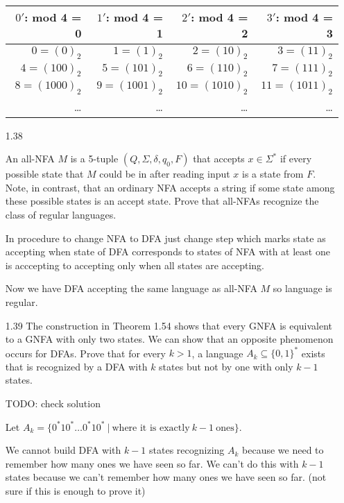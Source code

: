 \begin{enumerate}
          \begin{table}[H]
              \centering
              \begin{tabular}{|r|r|r|r|}
                  \hline
                  $0'$: mod 4 = 0 & $1'$: mod  4 = 1 & $2'$: mod 4 = 2 & $3'$: mod 4 = 3 \\
                  \hline
                  $0 = (0)_2$     & $1 = (1)_2$      & $2 = (10)_2$    & $3 = (11)_2$    \\
                  $4 = (100)_2$   & $5 = (101)_2$    & $6 = (110)_2$   & $7 = (111)_2$   \\
                  $8 = (1000)_2$  & $9 = (1001)_2$   & $10 = (1010)_2$ & $11 = (1011)_2$ \\
                  \ldots          & \ldots           & \ldots          & \ldots          \\
                  \hline
              \end{tabular}
          \end{table}

    \item [1.38]

          An all-NFA $M$ is a 5-tuple $(Q,\Sigma,\delta,q_0,F)$ that accepts $x \in \Sigma^\ast$ if every possible state that $M$ could be in after reading input $x$ is a state from $F$. Note, in contrast, that an ordinary NFA accepts a string if some state among these possible states is an accept state. Prove that all-NFAs recognize the class of regular languages.

          In procedure to change NFA to DFA just change step which marks state as accepting when state of DFA corresponds to states of NFA with at least one is acccepting to accepting only when all states are accepting.

          Now we have DFA accepting the same language as all-NFA $M$ so language is regular.
    \item [1.39]
          The construction in Theorem 1.54 shows that every GNFA is equivalent to a GNFA with only two states. We can show that an opposite phenomenon occurs for DFAs. Prove that for every $k > 1$, a language $A_k \subseteq \{0,1\}^\ast$ exists that is recognized by a DFA with $k$ states but not by one with only $k-1$ states.

          TODO: check solution

          Let $A_k = \{0^\ast10^\ast \ldots 0^\ast10^\ast ~|~ \text{where it is exactly}~k-1~\text{ones}\}$.

          We cannot build DFA with $k-1$ states recognizing $A_k$ because we need to remember how many ones we have seen so far. We can't do this with $k-1$ states because we can't remember how many ones we have seen so far. (not sure if this is enough to prove it)


\end{enumerate}
